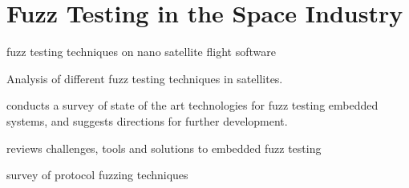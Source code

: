 \documentclass[../report.tex]{subfiles}
\begin{document}
\section{Fuzz Testing in the Space Industry}



\citet{Gutierrez_2021} fuzz testing techniques on nano satellite flight software

\citet{Willbold_2024} Analysis of different fuzz testing techniques in satellites.



\citet{Yun_2022} conducts a survey of state of the art technologies for fuzz testing embedded systems, and suggests directions for further development.

\citet{Eisele_et_al_2022} reviews challenges, tools and solutions to embedded fuzz testing


\citet{Zhang_2024} survey of protocol fuzzing techniques


\end{document}
